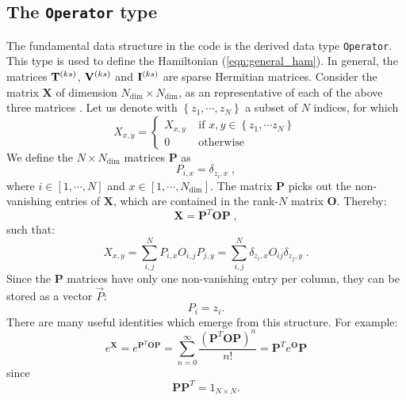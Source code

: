 \subsection{The \texttt{Operator} type}\label{sec:op}
The fundamental data structure in the code is the derived data type \texttt{Operator}. 
This type is used to define the Hamiltonian (\ref{eqn:general_ham}).
In general, the matrices ${\bf T}^{(ks)}$, ${\bf V}^{(ks)}$ and ${\bf I}^{(ks)}$ are sparse Hermitian matrices.
Consider the  matrix   ${\bm X}$ of dimension  $N_{\mathrm{dim}} \times N_{\mathrm{dim}}$, as an representative of each of the above three matrices .  Let us  denote  with  $ \left\{z_{1},\cdots,  z_{N}  \right\}$  a subset  of $N$ indices,  
for which
\begin{equation}
X_{x,y}  =
\left\{\begin{matrix}  X_{x,y}  &  \text{ if }   x,  y  \in \left\{ z_1, \cdots z_N \right\}\\ 
                                  0         &  \text{ otherwise } 
      \end{matrix}\right.
\end{equation}
 We define the $N \times N_{\mathrm{dim}}$ matrices $\mathbf{P}$  as
\begin{equation}
P_{i,x}=\delta_{z_{i},x}\;,
\end{equation}
where $i \in [1,\cdots, N ]$ and $ x  \in [1,\cdots, N_{\mathrm{dim}}]$. The matrix  $\bm{P}$ picks out the non-vanishing entries of $\bm{X}$, 
which are contained in the rank-$N$  matrix $\bm{O}$.  Thereby: 
\begin{equation}
\bm{X} =\bm{P}^{T} \bm{O} \bm{P}\;,
\end{equation}
such that:
\begin{equation}
X_{x,y} = \sum\limits_{i,j}^{N}  P_{i,x}  O_{i,j} P_{j,y}=\sum\limits_{i,j}^{N} \delta_{z_{i},x}  O_{ij} \delta_{z_{j},y} \;.
\end{equation}
Since  the  $\bm{P}$ matrices have only one non-vanishing entry per column,  they can be stored as a vector $\vec{P}$:
\begin{equation}
     P_i = z_i.
\end{equation}  
There are  many useful  identities which emerge from this  structure. For example: 
\begin{equation}
	e^{\bm{X}} =  e^{\bm{P}^{T} \bm{O} \bm{P}}   = \sum_{n=0}^{\infty}  \frac{\left( \bm{P}^{T} \bm{O} \bm{P} \right)^n}{n!} =  \bm{P}^{T} e^{ \bm{O} } \bm{P}
\end{equation}
since 
\begin{equation} 
	 \bm{P} \bm{P}^{T}= 1_{N\times N}.
\end{equation}

